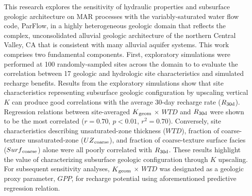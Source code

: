 This research explores the sensitivity of hydraulic properties and subsurface geologic architecture on MAR processes with the variably-saturated water flow code, ParFlow, in a highly heterogeneous geologic domain that reflects the complex, unconsolidated alluvial geologic architecture of the northern Central Valley, CA that is consistent with many alluvial aquifer systems. This work comprises two fundamental components. First, exploratory simulations were performed at 100 randomly-sampled sites across the domain to to evaluate the correlation between 17 geologic and hydrologic site characteristics and simulated recharge benefits. Results from the exploratory simulations show that site characteristics representing subsurface geologic configuration by upscaling vertical $K$ can produce good correlations with the average 30-day recharge rate ($R\textsubscript{30d}$). Regression relations between site-averaged $K\textsubscript{geom}$ $\times$ $WTD$ and $R\textsubscript{30d}$ were shown to be the most correlated ($r = 0.70$, $p < 0.01$, $r^2 = 0.70$). Conversely, site characteristics describing unsaturated-zone thickness ($WTD$), fraction of coarse-texture unsaturated-zone ($UZ\textsubscript{coarse}$), and fraction of coarse-texture surface facies ($Surf\textsubscript{coarse}$) alone were all poorly correlated with $R\textsubscript{30d}$. These results highlight the value of characterizing subsurface geologic configuration through $K$ upscaling. For subsequent sensitivity analyses, $K\textsubscript{geom}$ $\times$ $WTD$ was designated as a geologic proxy parameter, $GPP$, for recharge potential using aforementioned predictive regression relation.
 
